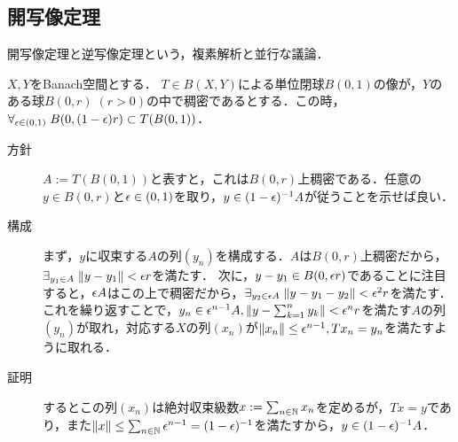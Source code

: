 \documentclass[uplatex,dvipdfmx]{jsreport}
\begin{document}
\subsection{開写像定理}

\begin{tcolorbox}[colframe=ForestGreen, colback=ForestGreen!10!white,breakable,colbacktitle=ForestGreen!40!white,coltitle=black,fonttitle=\bfseries\sffamily,
title=]
    開写像定理と逆写像定理という，複素解析と並行な議論．
\end{tcolorbox}

\begin{lemma}[単位閉球の像の描像]\label{lemma-image-of-ball}
    $X,Y$をBanach空間とする．
    $T\in B(X,Y)$による単位閉球$B(0,1)$の像が，$Y$のある球$B(0,r)\;(r>0)$の中で稠密であるとする．この時，$\forall_{\epsilon\in(0,1)}\; B(0,(1-\epsilon)r)\subset T(B(0,1))$．
\end{lemma}
\begin{Proof}\mbox{}
    \begin{description}
        \item[方針] $A:=T(B(0,1))$と表すと，これは$B(0,r)$上稠密である．任意の$y\in B(0,r)$と$\epsilon\in(0,1)$を取り，$y\in(1-\epsilon)^{-1}A$が従うことを示せば良い．
        \item[構成] まず，$y$に収束する$A$の列$(y_n)$を構成する．$A$は$B(0,r)$上稠密だから，$\exists_{y_1\in A}\;\|y-y_1\|<\epsilon r$を満たす．
        次に，$y-y_1\in B(0,\epsilon r)$であることに注目すると，$\epsilon A$はこの上で稠密だから，$\exists_{y_2\in\epsilon A}\;\|y-y_1-y_2\|<\epsilon^2r$を満たす．
        これを繰り返すことで，$y_n\in\epsilon^{n-1}A,\left\|y-\sum^n_{k=1}y_k\right\|<\epsilon^nr$を満たす$A$の列$(y_n)$が取れ，対応する$X$の列$(x_n)$が$\|x_n\|\le\epsilon^{n-1},Tx_n=y_n$を満たすように取れる．
        \item[証明] するとこの列$(x_n)$は絶対収束級数$x:=\sum_{n\in\mathbb{N}}x_n$を定めるが，$Tx=y$であり，また$\|x\|\le\sum_{n\in\mathbb{N}}\epsilon^{n-1}=(1-\epsilon)^{-1}$を満たすから，$y\in(1-\epsilon)^{-1}A$．
    \end{description}
\end{Proof}
\end{document}
